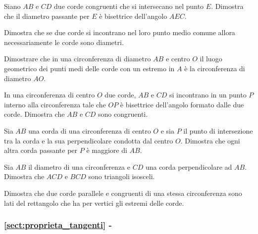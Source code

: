 \begin{multicols}{2}
\begin{esercizio}
\label{ese:5.13}
Siano $AB$ e $CD$ due corde congruenti che si intersecano nel punto $E$. Dimostra che il diametro passante per $E$ è bisettrice dell'angolo $AEC$.
\end{esercizio}

\begin{esercizio}
\label{ese:5.14}
Dimostra che se due corde si incontrano nel loro punto medio comune allora necessariamente le corde sono diametri.
\end{esercizio}

\begin{esercizio}
\label{ese:5.15}
Dimostrare che in una circonferenza di diametro $AB$ e centro $O$ il luogo geometrico dei punti medi delle corde con un estremo in $A$ è la circonferenza di diametro $AO$.
\end{esercizio}

\begin{esercizio}
\label{ese:5.16}
In una circonferenza di centro $O$ due corde, $AB$ e $CD$ si incontrano in un punto $P$ interno alla circonferenza tale che $OP$ è bisettrice dell'angolo formato dalle due corde. Dimostra che $AB$ e $CD$ sono congruenti.
\end{esercizio}

\begin{esercizio}
\label{ese:5.17}
Sia $AB$ una corda di una circonferenza di centro $O$ e sia $P$ il punto di intersezione tra la corda e la sua perpendicolare condotta dal centro $O$. Dimostra che ogni altra corda passante per $P$ è maggiore di $AB$.
\end{esercizio}

\begin{esercizio}
\label{ese:5.18}
Sia $AB$ il diametro di una circonferenza e $CD$ una corda perpendicolare ad $AB$. Dimostra che $ACD$ e $BCD$ sono triangoli isosceli.
\end{esercizio}

\begin{esercizio}
\label{ese:5.19}
Dimostra che due corde parallele e congruenti di una stessa circonferenza sono lati del rettangolo che ha per vertici gli estremi delle corde.
\end{esercizio}

\begingroup
\hypersetup{linkcolor=black}
\subsubsection*{\ref{sect:proprieta_tangenti} - }
\endgroup


\end{multicols}
